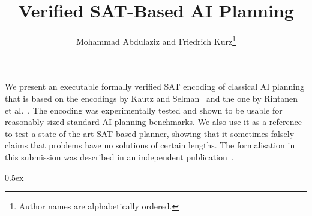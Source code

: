 \documentclass[11pt,a4paper]{article}
\begin{document}
\title{Verified SAT-Based AI Planning}
\author{Mohammad Abdulaziz and Friedrich Kurz\footnote{Author names are alphabetically ordered.}}

\date{}

\maketitle

We present an executable formally verified SAT encoding of classical AI planning that is based on the encodings by Kautz and Selman~\cite{kautz:selman:92} and the one by Rintanen et al.~\cite{DBLP:journals/ai/RintanenHN06}.
The encoding was experimentally tested and shown to be usable for reasonably sized standard AI planning benchmarks.
We also use it as a reference to test a state-of-the-art SAT-based planner, showing that it sometimes falsely claims that problems have no solutions of certain lengths.
The formalisation in this submission was described in an independent publication~\cite{verifiedSATPlan}.

\tableofcontents

\clearpage


\parindent 0pt\parskip 0.5ex

\newcommand{\isaname}[1]{}





\end{document}
